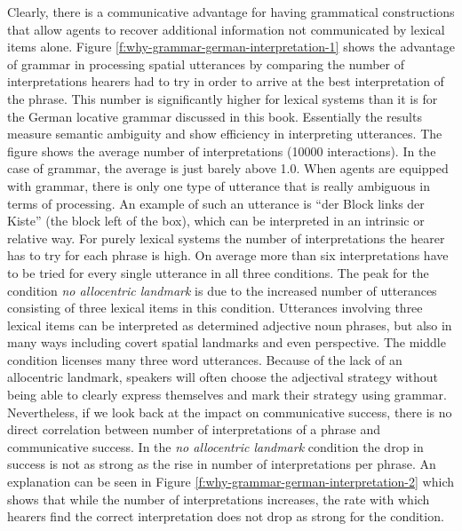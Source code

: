 Clearly, there is a communicative 
advantage for having grammatical constructions that allow agents to recover
additional information not communicated by lexical items alone.
Figure \ref{f:why-grammar-german-interpretation-1} shows the advantage of grammar 
in processing spatial utterances by comparing the number
of interpretations hearers had to try in order to arrive at the best interpretation
of the phrase. This number is significantly higher for lexical systems than it is 
for the German locative grammar discussed in this book. 
Essentially the results measure semantic ambiguity and show efficiency 
in interpreting utterances. The figure shows the average number 
of interpretations (10000 interactions). In the case of grammar, the 
average is just barely above 1.0. When agents are equipped 
with grammar, there is only one type of utterance that is really 
ambiguous in terms of processing. An example of such an utterance 
is ``der Block links der Kiste'' (the block left of the box),
which can be interpreted in an intrinsic or relative way. For purely 
lexical systems the number of interpretations the hearer has to try for 
each phrase is high. On average more than six interpretations have 
to be tried for every single utterance in all three conditions. The peak 
for the condition \emph{no allocentric landmark} is due to the 
increased number of utterances consisting of three lexical 
items in this condition. Utterances involving three lexical items can 
be interpreted as determined adjective noun phrases, but also in many 
ways including covert spatial landmarks and even perspective.
The middle condition licenses many three word utterances. Because of the 
lack of an allocentric landmark, speakers will often choose the adjectival 
strategy without being able to clearly express themselves and mark 
their strategy using grammar. Nevertheless, if we look back at the 
impact on communicative success, there is no direct correlation 
between number of interpretations of a phrase
and communicative success. In the \emph{no allocentric landmark} 
condition the drop in success is not as strong as the rise in number 
of interpretations per phrase. An explanation can be seen in Figure 
\ref{f:why-grammar-german-interpretation-2}
which shows that while the number of interpretations increases, the 
rate with which hearers find the correct interpretation does not 
drop as strong for the condition.

